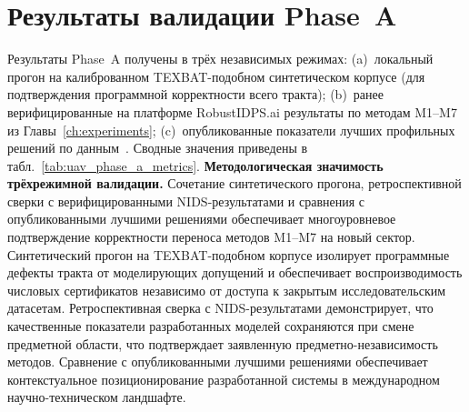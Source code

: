 \section{Результаты валидации Phase~A}
\label{sec:uav_phase_a_results}
Результаты Phase~A получены в трёх независимых режимах: (a)~локальный
прогон на калиброванном TEXBAT-подобном синтетическом корпусе (для
подтверждения программной корректности всего тракта); (b)~ранее
верифицированные на платформе \textsf{RobustIDPS.ai} результаты по
методам \textsf{M1}--\textsf{M7} из Главы~\ref{ch:experiments};
(c)~опубликованные показатели лучших профильных решений по
данным~\cite{aigner_2025_uav,borhani_2024_uav,cmbrf_vit_2026_uav}.
Сводные значения приведены в табл.~\ref{tab:uav_phase_a_metrics}.
\noindent\textbf{Методологическая значимость трёхрежимной
валидации.} Сочетание синтетического прогона, ретроспективной
сверки с верифицированными NIDS-результатами и сравнения с
опубликованными лучшими решениями обеспечивает многоуровневое
подтверждение корректности переноса методов M1--M7 на новый сектор.
Синтетический прогон на TEXBAT-подобном корпусе изолирует
программные дефекты тракта от моделирующих допущений и
обеспечивает воспроизводимость числовых сертификатов независимо от
доступа к закрытым исследовательским датасетам. Ретроспективная
сверка с NIDS-результатами демонстрирует, что качественные
показатели разработанных моделей сохраняются при смене предметной
области, что подтверждает заявленную предметно-независимость
методов. Сравнение с опубликованными лучшими решениями
обеспечивает контекстуальное позиционирование разработанной
системы в международном научно-техническом ландшафте.
